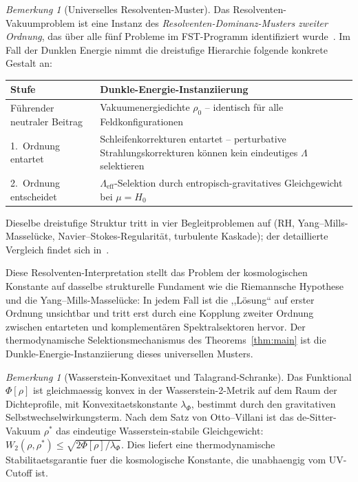 \documentclass[12pt,a4paper]{article}
\theoremstyle{definition}
\theoremstyle{plain}
\theoremstyle{remark}
\newtheorem{remark}[definition]{Bemerkung}
\begin{document}
\begin{remark}[Universelles Resolventen-Muster]\label{rem:universal-resolvent}
Das Resolventen-Vakuumproblem ist eine Instanz des
\emph{Resolventen-Dominanz-Musters zweiter Ordnung}, das \"uber alle f\"unf
Probleme im FST-Programm identifiziert wurde~\cite{FST-Unified2026}.
Im Fall der Dunklen Energie nimmt die dreistufige Hierarchie
folgende konkrete Gestalt an:

\begin{center}
\begin{tabular}{p{3.5cm}p{8.5cm}}
\hline
\textbf{Stufe} & \textbf{Dunkle-Energie-Instanziierung} \\
\hline
F\"uhrender neutraler Beitrag & Vakuumenergiedichte $\rho_0$ -- identisch f\"ur alle Feldkonfigurationen \\
1.\ Ordnung entartet & Schleifenkorrekturen entartet -- perturbative Strahlungskorrekturen k\"onnen kein eindeutiges $\Lambda$ selektieren \\
2.\ Ordnung entscheidet & $\Lambda_{\mathrm{eff}}$-Selektion durch entropisch-gravitatives Gleichgewicht bei $\mu = H_0$ \\
\hline
\end{tabular}
\end{center}

\noindent
Dieselbe dreistufige Struktur tritt in vier Begleitproblemen auf
(RH, Yang--Mills-Massel\"ucke, Navier--Stokes-Regularit\"at, turbulente Kaskade);
der detaillierte Vergleich findet sich in~\cite{FST-Unified2026}.
\end{remark}

\noindent
Diese Resolventen-Interpretation stellt das Problem der kosmologischen
Konstante auf dasselbe strukturelle Fundament wie die Riemannsche
Hypothese und die Yang--Mills-Massel\"ucke: In jedem Fall ist die
,,L\"osung`` auf erster Ordnung unsichtbar und tritt erst durch eine
Kopplung zweiter Ordnung zwischen entarteten und komplement\"aren
Spektralsektoren hervor. Der thermodynamische Selektionsmechanismus
des Theorems~\ref{thm:main} ist die Dunkle-Energie-Instanziierung
dieses universellen Musters.

\begin{remark}[Wasserstein-Konvexitaet und Talagrand-Schranke]
\label{rem:talagrand}
Das Funktional $\Phi[\rho]$ ist gleichmaessig konvex in der Wasserstein-2-Metrik auf dem Raum der Dichteprofile, mit Konvexitaetskonstante $\lambda_\Phi$, bestimmt durch den gravitativen Selbstwechselwirkungsterm. Nach dem Satz von Otto--Villani ist das de-Sitter-Vakuum $\rho^*$ das eindeutige Wasserstein-stabile Gleichgewicht: $W_2(\rho, \rho^*) \leq \sqrt{2 \Phi[\rho] / \lambda_\Phi}$. Dies liefert eine thermodynamische Stabilitaetsgarantie fuer die kosmologische Konstante, die unabhaengig vom UV-Cutoff ist.
\end{remark}
\end{document}
